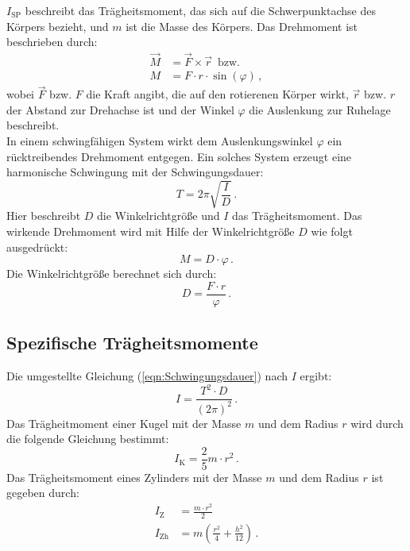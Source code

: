 %
$I_{\text{SP}}$ beschreibt das Trägheitsmoment, das sich auf die Schwerpunktachse des Körpers bezieht, und $m$
ist die Masse des Körpers. 
Das Drehmoment ist beschrieben durch:
\begin{align}
    \vec{M} &= \vec{F} \times \vec {r}\, \text{  bzw.} \label{eqn:DrehmomentVektor} \\
    M &= F \cdot r \cdot \sin \left(\varphi \right) \,, \label{eqn:DrehmomentSkalar}
\end{align}
%
wobei $\vec{F}$ bzw. $F$ die Kraft angibt, die auf den rotierenen Körper wirkt, $\vec{r}$ 
bzw. $r$ der Abstand zur Drehachse ist und der Winkel $\varphi$ die Auslenkung zur
Ruhelage beschreibt. \\
In einem schwingfähigen System wirkt dem Auslenkungswinkel $\varphi$ ein rücktreibendes Drehmoment entgegen.
Ein solches System erzeugt eine harmonische Schwingung mit der Schwingungsdauer: 
\begin{equation}
    T = 2 \pi \sqrt{\frac{I}{D}}\,.
    \label{eqn:Schwingungsdauer}
 \end{equation}
Hier beschreibt $D$ die Winkelrichtgröße und $I$ das Trägheitsmoment.  
Das wirkende Drehmoment wird mit Hilfe der Winkelrichtgröße $D$ wie folgt ausgedrückt:
\begin{equation}
   M = D \cdot \varphi\,.
   \label{eqn:DrehmomentMitWinkelrichtgröße}
\end{equation}
%
Die Winkelrichtgröße berechnet sich durch: 
\begin{equation}
   D = \frac{F \cdot r}{\varphi}\,.
    \label{eqn:Winkelrichtgröße}
\end{equation}
%
\subsection{Spezifische Trägheitsmomente}
\label{sec:Trägheitsmomente}
Die umgestellte Gleichung (\ref{eqn:Schwingungsdauer}) nach $I$ ergibt:
\begin{equation}
    I = \frac{T^{2} \cdot D}{\left(2 \pi\right)^{2}}\,.
    \label{eqn:TragheitmomentAusSchwingungsdauer}
\end{equation}
%
Das Trägheitmoment einer Kugel mit der Masse $m$ und dem Radius $r$ wird durch die folgende Gleichung
bestimmt: 
\begin{equation}
    I_{\text{K}} = \frac{2}{5}m \cdot r^{2}\,.
    \label{eqn:TragheitKugel}
\end{equation}
Das Trägheitsmoment eines Zylinders mit der Masse $m$ und dem Radius $r$ ist gegeben 
durch:
\begin{align}
    I_{\text{Z}} &= \frac{m \cdot r^2}{2} \label{eqn:TragheitZylinder} \\
    I_{\text{Zh}} &= m \left(\frac{r^{2}}{4} + \frac{h^{2}}{12} \right) \label{eqn:TrägheitZylinderQuer}\,.
\end{align}
%
%
